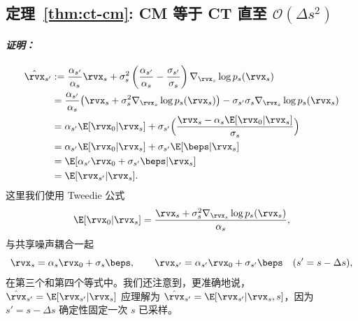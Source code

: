 \subsection{定理~\ref{thm:ct-cm}: CM 等于 CT 直至 $\mathcal{O}(\Delta s^2)$}

\paragraph{\textit{证明：}}

\begin{align*}
\hat\rvx_{s'}
&:= \frac{\alpha_{s'}}{\alpha_s} \rvx_s
+ \sigma_s^2 \left(\frac{\alpha_{s'}}{\alpha_s}-\frac{\sigma_{s'}}{\sigma_s}\right)\nabla_{\rvx_s}\log p_s(\rvx_s)
\\
&= \frac{\alpha_{s'}}{\alpha_s}\bigl(\rvx_s+\sigma_s^2\nabla_{\rvx_s}\log p_s(\rvx_s)\bigr)
- \sigma_{s'}\sigma_s \nabla_{\rvx_s}\log p_s(\rvx_s)
\\
&= \alpha_{s'} \E[\rvx_0|\rvx_s]
+ \sigma_{s'}\Bigl(\frac{\rvx_s-\alpha_s \E[\rvx_0|\rvx_s]}{\sigma_s}\Bigr)
\\
&= \alpha_{s'} \E[\rvx_0|\rvx_s] + \sigma_{s'} \E[\beps|\rvx_s]
\\
&= \E[\alpha_{s'}\rvx_0+\sigma_{s'}\beps|\rvx_s]
\\
&= \E[\rvx_{s'}|\rvx_s].
\end{align*}
这里我们使用 Tweedie 公式
\[
\E[\rvx_0 |\rvx_s]=\frac{\rvx_s+\sigma_s^2\nabla_{\rvx_s}\log p_s(\rvx_s)}{\alpha_s},
\]
与共享噪声耦合一起
\[
\rvx_s=\alpha_s\rvx_0+\sigma_s\beps,
\qquad
\rvx_{s'}=\alpha_{s'}\rvx_0+\sigma_{s'}\beps
\quad (s'=s-\Delta s),
\]
在第三个和第四个等式中。我们还注意到，更准确地说， $\hat\rvx_{s'}=\E[\rvx_{s'}|\rvx_s]$ 应理解为
$\hat\rvx_{s'}=\E[\rvx_{s'}|\rvx_s, s]$，因为 $s'=s-\Delta s$ 确定性固定一次 $s$ 已采样。



